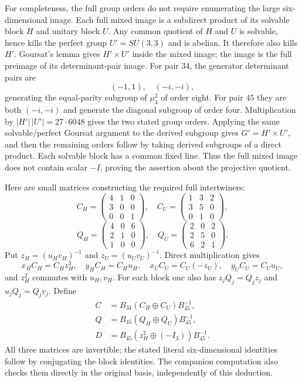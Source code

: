 For completeness, the full group orders do not require enumerating
the large six-dimensional image.  Each full mixed image is a
subdirect product of its solvable block $H$ and unitary block $U$.
Any common quotient of $H$ and $U$ is solvable, hence kills the
perfect group $U'=SU(3,3)$ and is abelian.  It therefore also kills
$H'$.  Goursat's lemma gives $H'\times U'$ inside the mixed image;
the image is the full preimage of its determinant-pair image.
For pair $34$, the generator determinant pairs are
\[
 (-1,1),\quad(-i,-i),
\]
generating the equal-parity subgroup of $\mu_4^2$ of order eight.
For pair $45$ they are both $(-i,-i)$ and generate the diagonal
subgroup of order four.  Multiplication by
$|H'|\,|U'|=27\cdot6048$ gives the two stated group orders.
Applying the same solvable/perfect Goursat argument to the derived
subgroup gives $G'=H'\times U'$, and then the remaining orders
follow by taking derived subgroups of a direct product.  Each
solvable block has a common fixed line.  Thus the full mixed image
does not contain scalar $-I$, proving the assertion about the
projective quotient.

Here are small matrices constructing the required full intertwiners:
\[
 C_H=\begin{pmatrix}4&1&0\\3&0&0\\0&0&1\end{pmatrix},
 \quad C_U=\begin{pmatrix}1&3&2\\3&5&0\\0&1&0\end{pmatrix},
\]
\[
 Q_H=\begin{pmatrix}4&0&6\\2&1&0\\1&0&0\end{pmatrix},
 \quad Q_U=\begin{pmatrix}2&0&2\\2&5&0\\6&2&1\end{pmatrix}.
\]
Put $z_H=(u_Hv_H)^{-1}$ and $z_U=(u_Uv_U)^{-1}$.  Direct
multiplication gives
\[
 x_HC_H=C_Hz_H^3,\quad y_HC_H=C_Hu_H,
 \quad x_UC_U=C_U(-z_U),\quad y_UC_U=C_Uu_U,
\]
and $z_H^2$ commutes with $u_H,v_H$.  For each block one also has
$z_jQ_j=Q_jz_j$ and $u_jQ_j=Q_jv_j$.  Define
\[
 \begin{split}
 C&=B_{34}(C_H\oplus C_U)B_{45}^{-1},\\
 Q&=B_{45}(Q_H\oplus Q_U)B_{45}^{-1},\\
 D&=B_{45}(z_H^2\oplus(-I_3))B_{45}^{-1}.
 \end{split}
\]
All three matrices are invertible; the stated literal
six-dimensional identities follow by conjugating the block
identities.  The companion computation also checks them directly
in the original basis, independently of this deduction.

